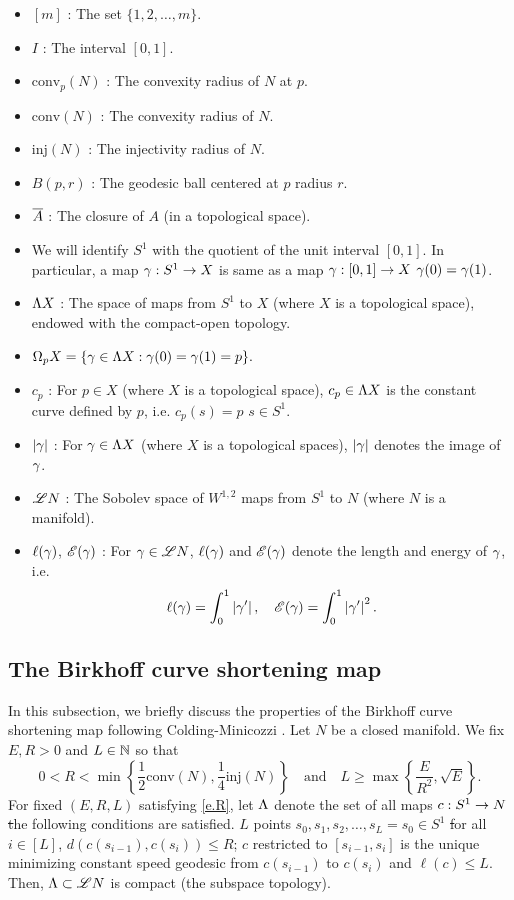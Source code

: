 \documentclass[11pt,twoside]{article}
\begin{document}
\begin{itemize}
	\item $[m]$ : The set \(\{1,2,\dots,m\}\). 	
	\item $I$ : The interval $[0,1]$.
	\item \(\text{conv}_p(N)\) : The convexity radius of $N$ at $p$.
	\item \(\text{conv}(N)\) : The convexity radius of $N$.
	\item \(\text{inj}(N)\) : The injectivity radius of \(N\).
	\item \(B(p,r)\) : The geodesic ball centered at $p$ \w radius $r$.
	\item \(\overline{A}\) : The closure of \(A\) (in a topological space).
	\item We will identify \(S^1\) with the quotient of the unit interval \([0,1]\). In particular, a \cts map \(\gamma:S^1 \rightarrow X\) is same as a \cts map \(\gamma: [0,1]\rightarrow X\) \w \(\gamma(0)=\gamma(1)\).
	\item \(\Lambda X\) : The space of \cts maps from \(S^1\) to \(X\) (where \(X\) is a topological space), endowed with the compact-open topology.
	\item \(\Omega_pX = \{\gamma\in \Lambda X: \gamma(0)=\gamma(1)=p\}.\)
	\item \(c_p\) : For \(p\in X\) (where \(X\) is a topological space), $c_p\in \Lambda X$ is the constant curve defined by $p$, i.e. \(c_p(s)=p\) \fa $s\in S^1$.
	\item \(\left|\gamma\right|\) : For \(\gamma\in \Lambda X\) (where \(X\) is a topological spaces), \(\left|\gamma\right|\) denotes the image of \(\gamma\).
	\item \(\mathscr{L} N\) : The Sobolev space of \(W^{1,2}\) maps from \(S^1\) to \(N\) (where \(N\) is a \Rm manifold).
	\item \(\ell(\gamma)\), \(\mathscr{E}(\gamma)\) : For \(\gamma \in \mathscr{L} N\), \(\ell(\gamma)\) and \(\mathscr{E}(\gamma)\) denote the length and energy of \(\gamma\), i.e.
	\[\ell(\gamma)=\int_{0}^{1}\left|\gamma'\right|,\quad \mathscr{E}(\gamma)=\int_{0}^{1}\left|\gamma'\right|^2.\]
	
\end{itemize}

\subsection{The Birkhoff curve shortening map}
In this subsection, we briefly discuss the properties of the Birkhoff curve shortening map following Colding-Minicozzi \cite{CM_article,CM_book}. Let $N$ be a closed \Rm manifold. We fix \(E, R>0\) and \(L\in \mathbb{N}\) so that 
\begin{equation}\label{e.R}
0<R<\min\left\{\frac{1}{2}\text{conv}(N), \frac{1}{4}\text{inj}(N)\right\}\quad\text{and}\quad L\geq \max\left\{\frac{E}{R^2},\sqrt{E}\right\}.
\end{equation}
For fixed $(E,R,L)$ satisfying \eqref{e.R}, let \(\Lambda\) denote the set of all maps \(c: S^1 \rightarrow N\) \st the following conditions are satisfied. \Te \(L\) points \(s_0,s_1,s_2,\dots,s_L=s_0\in S^1\) \st for all \(i\in [L]\), $d(c(s_{i-1}),c(s_i))\leq R$; \(c\) restricted to \([s_{i-1},s_i]\) is the unique minimizing constant speed geodesic from \(c(s_{i-1})\) to \(c(s_{i})\) and \(\ell(c)\leq L\). Then, \(\Lambda \subset \mathscr{L} N\) is compact (\wrt the subspace topology). 
\end{document}
